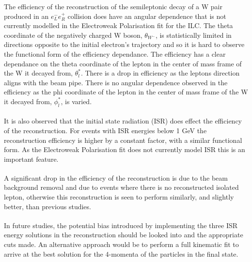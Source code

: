 The efficiency of the reconstruction of the semileptonic decay of a W pair produced in an ${e}_{L}^{-}{e}_{R}^{+}$ collision does have an angular dependence that is not currently modelled in the Electroweak Polarisation fit for the ILC. The theta coordinate of the negatively charged W boson, ${\theta}_{{W}^{-}}$, is statistically limited in directions opposite to the initial electron's trajectory and so it is hard to observe the functional form of the efficiency dependance. The efficiency has a clear dependance on the theta coordinate of the lepton in the center of mass frame of the W it decayed from, ${\theta}_{l}^{*}$. There is a drop in efficiency as the leptons direction aligns with the beam pipe. There is no angular dependence observed in the efficiency as the phi coordinate of the lepton in the center of mass frame of the W it decayed from, ${\phi}_{l}^{*}$, is varied.
\\\\
It is also observed that the initial state radiation (ISR) does effect the efficiency of the reconstruction. For events with ISR energies below 1 GeV the reconstruction efficiency is higher by a constant factor, with a similar functional form. As the Electroweak Polarisation fit does not currently model ISR this is an important feature.
\\\\
A significant drop in the efficiency of the reconstruction is due to the beam background removal and due to events where there is no reconstructed isolated lepton, otherwise this reconstruction is seen to perform similarly, and slightly better, than previous studies.
\\\\
In future studies, the potential bias introduced by implementing the three ISR energy solutions in the reconstruction should be looked into and the appropriate cuts made. An alternative approach would be to perform a full kinematic fit to arrive at the best solution for the 4-momenta of the particles in the final state.
